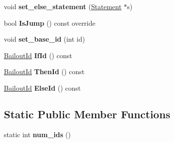 \begin{DoxyCompactItemize}
\item 
void {\bfseries set\+\_\+else\+\_\+statement} (\hyperlink{classv8_1_1internal_1_1_statement}{Statement} $\ast$s)\hypertarget{classv8_1_1internal_1_1_if_statement_a3f93dfe4c33cb60f5dc34d711f5a13a7}{}\label{classv8_1_1internal_1_1_if_statement_a3f93dfe4c33cb60f5dc34d711f5a13a7}

\item 
bool {\bfseries Is\+Jump} () const  override\hypertarget{classv8_1_1internal_1_1_if_statement_a80763d09e74193d1125da622baca52cb}{}\label{classv8_1_1internal_1_1_if_statement_a80763d09e74193d1125da622baca52cb}

\item 
void {\bfseries set\+\_\+base\+\_\+id} (int id)\hypertarget{classv8_1_1internal_1_1_if_statement_ab696e21b7dbee4b129626289c77d2c39}{}\label{classv8_1_1internal_1_1_if_statement_ab696e21b7dbee4b129626289c77d2c39}

\item 
\hyperlink{classv8_1_1internal_1_1_bailout_id}{Bailout\+Id} {\bfseries If\+Id} () const \hypertarget{classv8_1_1internal_1_1_if_statement_ab375b37e64eb2101ab34bbd6edee7710}{}\label{classv8_1_1internal_1_1_if_statement_ab375b37e64eb2101ab34bbd6edee7710}

\item 
\hyperlink{classv8_1_1internal_1_1_bailout_id}{Bailout\+Id} {\bfseries Then\+Id} () const \hypertarget{classv8_1_1internal_1_1_if_statement_a70e7343f855332d5232394b9427a9cf3}{}\label{classv8_1_1internal_1_1_if_statement_a70e7343f855332d5232394b9427a9cf3}

\item 
\hyperlink{classv8_1_1internal_1_1_bailout_id}{Bailout\+Id} {\bfseries Else\+Id} () const \hypertarget{classv8_1_1internal_1_1_if_statement_ade875b08fd6a93e75958be1550cb8bf6}{}\label{classv8_1_1internal_1_1_if_statement_ade875b08fd6a93e75958be1550cb8bf6}

\end{DoxyCompactItemize}
\subsection*{Static Public Member Functions}
\begin{DoxyCompactItemize}
\item 
static int {\bfseries num\+\_\+ids} ()\hypertarget{classv8_1_1internal_1_1_if_statement_a109a2ddc05c989c2504eb3b5a5e247d3}{}\label{classv8_1_1internal_1_1_if_statement_a109a2ddc05c989c2504eb3b5a5e247d3}

\end{DoxyCompactItemize}
